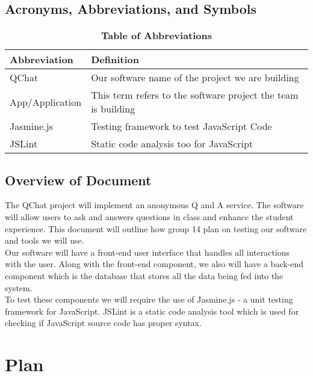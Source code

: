 \documentclass[12pt, titlepage]{article}
\begin{document}
\subsection{Acronyms, Abbreviations, and Symbols}
	
\begin{table}[hbp]
\caption{\textbf{Table of Abbreviations}} \label{Table}

\begin{tabularx}{\textwidth}{p{3cm}X}
\toprule
\textbf{Abbreviation} & \textbf{Definition} \\
\midrule
QChat & Our software name of the project we are building\\
App/Application & This term refers to the software project the team is building\\
Jasmine.js & Testing framework to test JavaScript Code\\
JSLint & Static code analysis too for JavaScript\\

\bottomrule
\end{tabularx}

\end{table}

\subsection{Overview of Document}

The QChat project will implement an anonymous Q and A service. The software will allow users to ask and answers questions in class and enhance the student experience. This document will outline how group 14 plan on testing our software and tools we will use. \\

Our software will have a front-end user interface that handles all interactions with the user. Along with the front-end component, we also will have a back-end component which is the database that stores all the data being fed into the system. \\

To test these components we will require the use of Jasmine.js - a unit testing framework for JavaScript. JSLint is a static code analysis tool which is used for checking if JavaScript source code has proper syntax. \\

\section{Plan}
	
\end{document}
